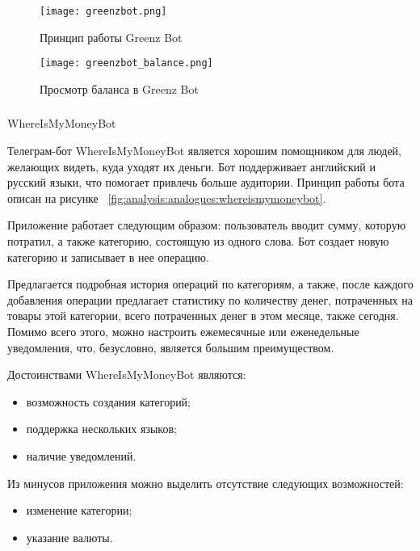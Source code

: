 \begin{figure}
	\centering
	\texttt{[image: greenzbot.png]} 
	\caption{Принцип работы Greenz Bot}
	\label{fig:analysis:analogues:greenz}
\end{figure}

\begin{figure}
	\centering
	\texttt{[image: greenzbot\_balance.png]} 
	\caption{Просмотр баланса в Greenz Bot}
	\label{fig:analysis:analogues:greenz_balance}
\end{figure}

\vskip 0.7in

\subsubsection{} WhereIsMyMoneyBot
\label{sec:analysis:analogues:whereismymoney}

Телеграм-бот WhereIsMyMoneyBot является хорошим помощником \linebreak для людей, желающих видеть, куда уходят их деньги. Бот поддерживает английский и русский языки, что помогает привлечь больше аудитории. Принцип работы бота описан на рисунке ~\ref{fig:analysis:analogues:whereismymoneybot}.

Приложение работает следующим образом: пользователь вводит сумму, которую потратил, а также категорию, состоящую из одного слова. Бот создает новую категорию и записывает в нее операцию.

Предлагается подробная история операций по категориям, а также, после каждого добавления операции предлагает статистику по количеству денег, потраченных на товары этой категории, всего потраченных денег в этом месяце, также сегодня. Помимо всего этого, можно настроить ежемесячные или еженедельные уведомления, что, безусловно, является большим преимуществом.

Достоинствами WhereIsMyMoneyBot являются:

\begin{itemize}
	\item возможность создания категорий;
	\item поддержка нескольких языков;
	\item наличие уведомлений.
\end{itemize}

Из минусов приложения можно выделить отсутствие следующих возможностей:

\begin{itemize}
	\item изменение категории;
	\item указание валюты.
\end{itemize}

